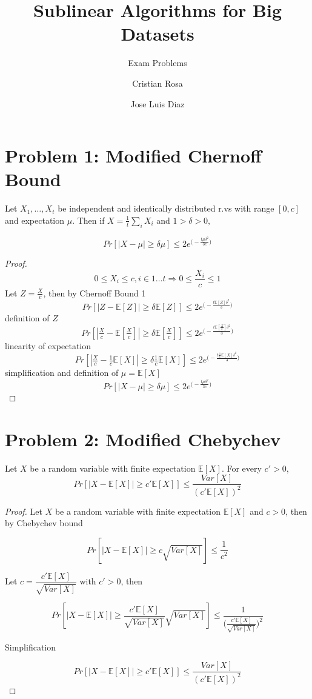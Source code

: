 \documentclass{scrartcl}
\title{Sublinear Algorithms for Big Datasets}
\subtitle{Exam Problems}
\author{Cristian Rosa \and Jose Luis Diaz}
\def\E{\mathds{E}}
\begin{document}
\maketitle

\section*{Problem 1: Modified Chernoff Bound}
Let $X_1, \dots, X_t$ be independent and identically distributed r.vs with range $[0,c]$
and expectation $\mu$. Then if $X = \frac{1}{t} \sum_i X_i$ and $1 > \delta > 0,$    

$$
Pr[|X - \mu| \geq \delta\mu ] \leq 2 e^{\big(- \tfrac{t\mu\delta^2}{3c}\big)}
$$

\begin{proof}
$$
0 \leq X_i \leq c, i \in 1\dots t \Rightarrow 0 \leq \frac{X_i}{c} \leq 1 
$$
Let $Z = \frac{X}{c}$, then by Chernoff Bound 1
$$
Pr[|Z - \E[Z] | \geq \delta \E[Z] ] \leq 2 e^{\big(- \tfrac{t\E[Z]\delta^2}{3}\big)} 
$$
definition of $Z$
$$
Pr[|\tfrac{X}{c} - \E[\tfrac{X}{c}] | \geq \delta \E[\tfrac{X}{c}] ] \leq 2 e^{\big(- \tfrac{t\E[\frac{X}{c}]\delta^2}{3}\big)}
$$
linearity of expectation
$$
Pr[|\tfrac{X}{c} - \tfrac{1}{c}\E[X] | \geq \delta \tfrac{1}{c}\E[X]] \leq 2 e^{\big(- \tfrac{t\frac{1}{c}\E[X]\delta^2}{3}\big)}
$$
simplification and definition of $\mu = \E[X]$
$$
Pr[|X - \mu | \geq \delta \mu] \leq 2 e^{\big(- \tfrac{t\mu\delta^2}{3c}\big)}
$$
\end{proof}

\section*{Problem 2: Modified Chebychev}

Let $X$ be a random variable with finite expectation $\E[X]$. For every $c' > 0 $,
$$
Pr[|X - \E[X]| \geq c'\E[X]] \leq \dfrac{Var[X]}{(c'\E[X])^2}
$$

\begin{proof}
Let $X$ be a random variable with finite expectation $\E[X]$ and $c > 0$, then by Chebychev bound

$$
Pr[|X - \E[X]| \geq c \sqrt{Var[X]}] \leq \dfrac{1}{c^2}
$$

Let $c = \dfrac{c' \E[X]}{\sqrt{Var[X]}}$ with $c' > 0$, then

$$
Pr[|X - \E[X]| \geq \dfrac{c' \E[X]}{\sqrt{Var[X]}} \sqrt{Var[X]}] \leq \dfrac{1}{\Big( \frac{c' \E[X]}{\sqrt{Var[X]}}\Big)^2}
$$

Simplification

$$
Pr[|X - \E[X]| \geq c'\E[X]] \leq \dfrac{Var[X]}{(c'\E[X])^2}
$$

\end{proof}
\end{document}
